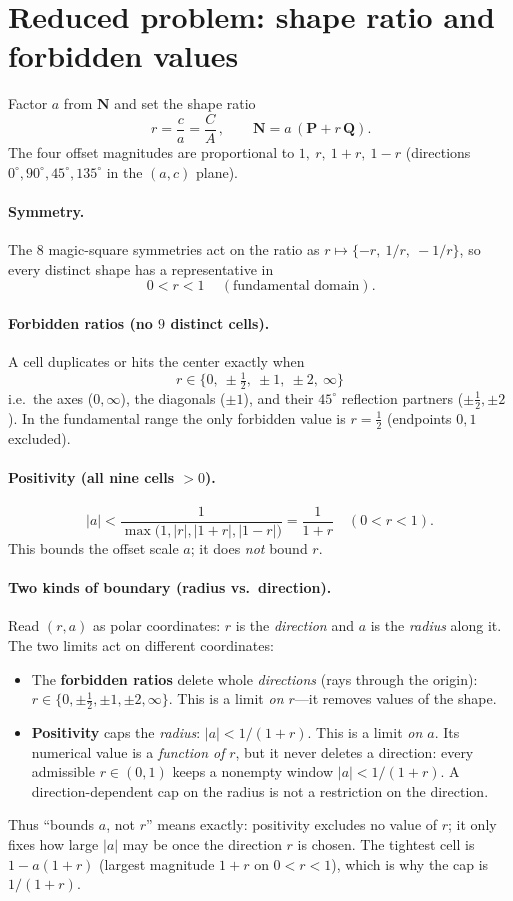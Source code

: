 \documentclass[11pt]{article}
\newcommand{\N}{\mathbf{N}}
\newcommand{\PP}{\mathbf{P}}
\newcommand{\QQ}{\mathbf{Q}}
\begin{document}
\section{Reduced problem: shape ratio and forbidden values}

Factor $a$ from $\N$ and set the shape ratio
\[
\boxed{\,r=\frac{c}{a}=\frac{C}{A}\,},\qquad \N=a\,(\PP+r\,\QQ).
\]
The four offset magnitudes are proportional to $1,\ r,\ 1+r,\ 1-r$
(directions $0^\circ,90^\circ,45^\circ,135^\circ$ in the $(a,c)$ plane).

\paragraph{Symmetry.} The $8$ magic-square symmetries act on the ratio as
$r\mapsto\{-r,\ 1/r,\ -1/r\}$, so every distinct shape has a representative in
\[
\boxed{\,0<r<1\,}\quad(\text{fundamental domain}).
\]

\paragraph{Forbidden ratios (no $9$ distinct cells).} A cell duplicates or hits
the center exactly when
\[
\boxed{\,r\in\{0,\ \pm\tfrac12,\ \pm1,\ \pm2,\ \infty\}\,}
\]
i.e.\ the axes ($0,\infty$), the diagonals ($\pm1$), and their $45^\circ$
reflection partners ($\pm\tfrac12,\pm2$). In the fundamental range the only
forbidden value is $r=\tfrac12$ (endpoints $0,1$ excluded).

\paragraph{Positivity (all nine cells $>0$).}
\[
|a|<\frac{1}{\max\bigl(1,|r|,|1+r|,|1-r|\bigr)}=\frac{1}{1+r}\quad(0<r<1).
\]
This bounds the offset scale $a$; it does \emph{not} bound $r$.

\paragraph{Two kinds of boundary (radius vs.\ direction).} Read $(r,a)$ as polar
coordinates: $r$ is the \emph{direction} and $a$ is the \emph{radius} along it.
The two limits act on different coordinates:
\begin{itemize}[nosep]
\item The \textbf{forbidden ratios} delete whole \emph{directions} (rays through
the origin): $r\in\{0,\pm\tfrac12,\pm1,\pm2,\infty\}$. This is a limit \emph{on
$r$}---it removes values of the shape.
\item \textbf{Positivity} caps the \emph{radius}: $|a|<1/(1+r)$. This is a limit
\emph{on $a$}. Its numerical value is a \emph{function of} $r$, but it never
deletes a direction: every admissible $r\in(0,1)$ keeps a nonempty window
$|a|<1/(1+r)$. A direction-dependent cap on the radius is not a restriction on the
direction.
\end{itemize}
Thus ``bounds $a$, not $r$'' means exactly: positivity excludes no value of $r$;
it only fixes how large $|a|$ may be once the direction $r$ is chosen. The tightest
cell is $1-a(1+r)$ (largest magnitude $1+r$ on $0<r<1$), which is why the cap is
$1/(1+r)$.
\end{document}
